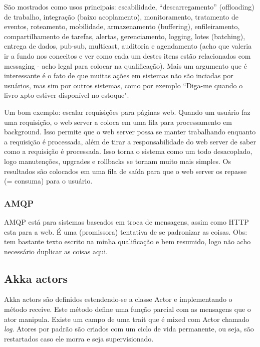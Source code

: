 \documentclass[]{article}
\begin{document}
			\par São mostrados como usos principais: escabilidade, ``descarregamento'' (offloading) de trabalho, integração 
			(baixo acoplamento),
			monitoramento, tratamento de eventos, roteamento, mobilidade, armazenamento (buffering), enfileiramento, 
			compartilhamento de tarefas, alertas, gerenciamento, logging, lotes (batching), entrega de dados,
			pub-sub, multicast, auditoria e agendamento (acho que valeria ir a fundo nos conceitos e ver como cada um
			destes itens estão relacionados com messaging - acho legal para colocar na qualificação). Mais um argumento
			que é interessante é o fato de que muitas ações em sistemas não são inciadas por usuários, mas sim
			por outros sistemas, como por exemplo ``Diga-me quando o livro xpto estiver disponível no estoque".

			\par Um bom exemplo: escalar requisições para páginas web. Quando um usuário faz uma requisição, o web server
			a coloca em uma fila para processamento em background. Isso permite que o web server possa se manter trabalhando
			enquanto a requisição é processada, além de tirar a responsabilidade do web server de saber como a requisição é 
			processada. Isso torna o sistema como um todo desacoplado, logo manutenções, upgrades e rollbacks se tornam
			muito mais simples. Os resultados são colocados em uma fila de saída para que o web server os repasse (= consuma)
			para o usuário.

		\subsubsection{AMQP}
			AMQP está para sistemas baseados em troca de mensagens, assim como HTTP esta para a web. É uma (promissora)
			tentativa de se padronizar as coisas. Obs: tem bastante texto escrito na minha qualificação e bem 
			resumido, logo não acho necessário duplicar as coisas aqui.		

		\subsection{Akka actors}
			Akka actors são definidos estendendo-se a classe Actor e implementando o método receive. Este método
			define uma função parcial com as mensagens que o ator manipula. Existe um campo de uma trait
			que é mixed com Actor chamado \textit{log}. Atores por padrão são criados com um ciclo de vida
			permanente, ou seja, são restartados caso ele morra e seja supervisionado.\\
\end{document}
